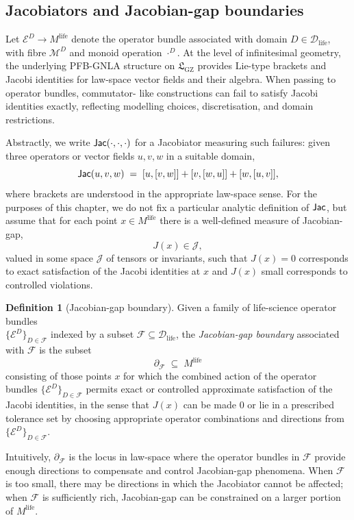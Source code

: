 \documentclass[11pt]{book}
\theoremstyle{plain}
\theoremstyle{definition}
\newtheorem{definition}[theorem]{Definition}
\theoremstyle{remark}
\newcommand{\GZLS}{\ensuremath{\mathfrak{L}_{\mathrm{GZ}}}}       \newcommand{\GZLT}{\ensuremath{M_{!w}}}                           \newcommand{\GZLOC}{\ensuremath{A_M}}                             \newcommand{\GZLCurv}{\ensuremath{\mathcal{F}_{\mathrm{law}}}}
\begin{document}
\subsection*{Jacobiators and Jacobian-gap boundaries}

Let $\mathcal{E}^{D} \to M^{\mathrm{life}}$ denote the operator bundle
associated with domain $D \in \mathcal{D}_{\mathrm{life}}$, with fibre
$\mathcal{M}^{D}$ and monoid operation $\cdot^{D}$. At the level of
infinitesimal geometry, the underlying PFB-GNLA structure on $\GZLS$
provides Lie-type brackets and Jacobi identities for law-space vector
fields and their algebra. When passing to operator bundles, commutator-
like constructions can fail to satisfy Jacobi identities exactly,
reflecting modelling choices, discretisation, and domain restrictions.

Abstractly, we write $\mathsf{Jac}(\cdot,\cdot,\cdot)$ for a Jacobiator
measuring such failures: given three operators or vector fields
$u,v,w$ in a suitable domain,
\[
  \mathsf{Jac}(u,v,w)
  \;=\;
  [u,[v,w]] + [v,[w,u]] + [w,[u,v]],
\]
where brackets are understood in the appropriate law-space sense.
For the purposes of this chapter, we do not fix a particular analytic
definition of $\mathsf{Jac}$, but assume that for each point
$x \in M^{\mathrm{life}}$ there is a well-defined measure of
Jacobian-gap,
\[
  J(x) \in \mathcal{J},
\]
valued in some space $\mathcal{J}$ of tensors or invariants, such that
$J(x) = 0$ corresponds to exact satisfaction of the Jacobi identities
at $x$ and $J(x)$ small corresponds to controlled violations.

\begin{definition}[Jacobian-gap boundary]
Given a family of life-science operator bundles\\
$\{\mathcal{E}^{D}\}_{D \in \mathcal{F}}$ indexed by a subset
$\mathcal{F} \subseteq \mathcal{D}_{\mathrm{life}}$, the
\emph{Jacobian-gap boundary} associated with $\mathcal{F}$ is the
subset
\[
  \partial_{\mathcal{F}} \;\subseteq\; M^{\mathrm{life}}
\]
consisting of those points $x$ for which the combined action of the
operator bundles $\{\mathcal{E}^{D}\}_{D \in \mathcal{F}}$ permits
exact or controlled approximate satisfaction of the Jacobi identities,
in the sense that $J(x)$ can be made $0$ or lie in a prescribed
tolerance set by choosing appropriate operator combinations and
directions from $\{\mathcal{E}^{D}\}_{D \in \mathcal{F}}$.
\end{definition}

Intuitively, $\partial_{\mathcal{F}}$ is the locus in law-space where
the operator bundles in $\mathcal{F}$ provide enough directions to
compensate and control Jacobian-gap phenomena. When $\mathcal{F}$ is
too small, there may be directions in which the Jacobiator cannot be
affected; when $\mathcal{F}$ is sufficiently rich, Jacobian-gap can
be constrained on a larger portion of $M^{\mathrm{life}}$.
\end{document}
